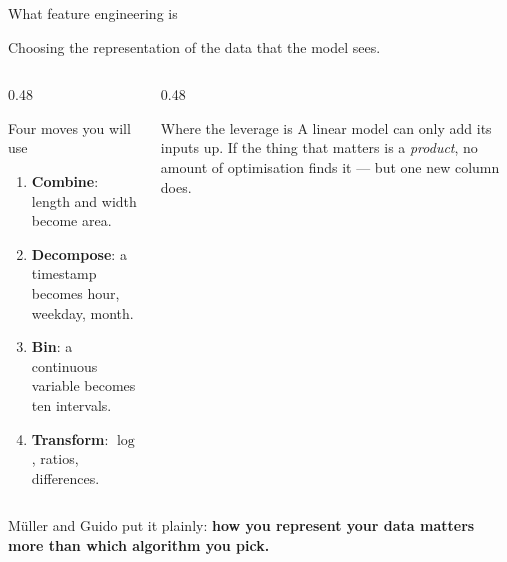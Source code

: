 \documentclass[aspectratio=169]{beamer}
\begin{document}
\begin{frame}[shrink=6]{What feature engineering is}
  \begin{exampleblock}{}
    \centering\large
    Choosing the representation of the data that the model sees.
  \end{exampleblock}
  \vspace{0.3em}
  \begin{columns}[T]
    \begin{column}{0.48\textwidth}
      \begin{block}{Four moves you will use}
        \begin{enumerate}\small
          \item \textbf{Combine}: length and width become area.
          \item \textbf{Decompose}: a timestamp becomes hour, weekday, month.
          \item \textbf{Bin}: a continuous variable becomes ten intervals.
          \item \textbf{Transform}: $\log$, ratios, differences.
        \end{enumerate}
      \end{block}
    \end{column}
    \begin{column}{0.48\textwidth}
      \begin{alertblock}{Where the leverage is}
        \small A linear model can only add its inputs up. If the thing that
        matters is a \emph{product}, no amount of optimisation finds it ---
        but one new column does.
      \end{alertblock}
    \end{column}
  \end{columns}
  \vspace{0.2em}
  \begin{center}\small
    Müller and Guido put it plainly: \textbf{how you represent your data
    matters more than which algorithm you pick.}
  \end{center}
\end{frame}
\end{document}
